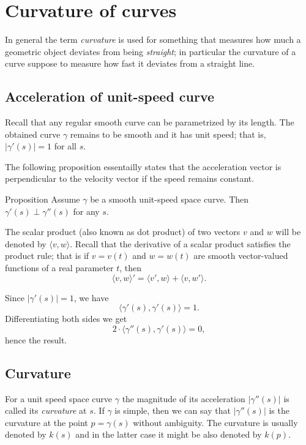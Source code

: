 \chapter{Curvature of curves}


In general the term \emph{curvature} is used for something that measures how much 
a geometric object deviates from being \emph{straight};
in particular the curvature of a curve suppose to measure how fast it deviates from a straight line.

\section*{Acceleration of unit-speed curve}

Recall that any regular smooth curve can be parametrized by its length.
The obtained curve $\gamma$ remains to be smooth and it has unit speed; 
that is, $|\gamma'(s)|=1$ for all $s$.

The following proposition essentailly states that the acceleration vector is perpendicular to the velocity vector if the speed remains constant.

\begin{thm}{Proposition}\label{prop:a'-pertp-a''}
Assume $\gamma$ be a smooth unit-speed space curve.
Then $\gamma'(s)\perp \gamma''(s)$ for any $s$.
\end{thm}

The scalar product (also known as dot product) of two vectors $v$ and $w$ will be denoted by $\langle v,w\rangle$.
Recall that the derivative of a scalar product satisfies the product rule;
that is if $v=v(t)$ and $w=w(t)$ are smooth vector-valued functions of a real parameter $t$, then
\[\langle v,w\rangle'=\langle v',w\rangle+\langle v,w'\rangle.\]

Since $|\gamma'(s)|=1$, we have
\[\langle\gamma'(s),\gamma'(s)\rangle=1.\]
Differentiating both sides we get
\[2\cdot\langle\gamma''(s),\gamma'(s)\rangle=0,\]
hence the result.
\qeds

\section*{Curvature}

For a unit speed space curve $\gamma$ the magnitude of its acceleration $|\gamma''(s)|$ is called its \emph{curvature} at $s$.
If $\gamma$ is simple, then we can say that $|\gamma''(s)|$ is the curvature at the point $p=\gamma(s)$ without ambiguity.
The curvature is usually denoted by $k(s)$ and in the latter case it might be also denoted by $k(p)$.

